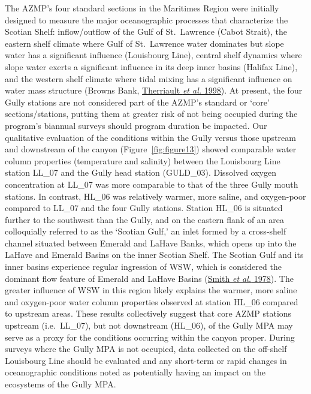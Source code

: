 \documentclass[12pt]{article}\usepackage[]{graphicx}\usepackage[]{color}
\begin{document}
The AZMP's four standard sections in the Maritimes Region were initially designed to measure the major oceanographic processes that characterize the Scotian Shelf: inflow/outflow of the Gulf of St.~Lawrence (Cabot Strait), the eastern shelf climate where Gulf of St.~Lawrence water dominates but slope water has a significant influence (Louisbourg Line), central shelf dynamics where slope water exerts a significant influence in its deep inner basins (Halifax Line), and the western shelf climate where tidal mixing has a significant influence on water mass structure (Browns Bank, \protect\hyperlink{ref-therriault_1998}{Therriault \textit{et al.} 1998}). At present, the four Gully stations are not considered part of the AZMP's standard or `core' sections/stations, putting them at greater risk of not being occupied during the program's biannual surveys should program duration be impacted. Our qualitative evaluation of the conditions within the Gully versus those upstream and downstream of the canyon (Figure~\ref{fig:figure13}) showed comparable water column properties (temperature and salinity) between the Louisbourg Line station LL\_07 and the Gully head station (GULD\_03). Dissolved oxygen concentration at LL\_07 was more comparable to that of the three Gully mouth stations. In contrast, HL\_06 was relatively warmer, more saline, and oxygen-poor compared to LL\_07 and the four Gully stations. Station HL\_06 is situated further to the southwest than the Gully, and on the eastern flank of an area colloquially referred to as the `Scotian Gulf,' an inlet formed by a cross-shelf channel situated between Emerald and LaHave Banks, which opens up into the LaHave and Emerald Basins on the inner Scotian Shelf. The Scotian Gulf and its inner basins experience regular ingression of WSW, which is considered the dominant flow feature of Emerald and LaHave Basins (\protect\hyperlink{ref-smith_1978}{Smith \textit{et al.} 1978}). The greater influence of WSW in this region likely explains the warmer, more saline and oxygen-poor water column properties observed at station HL\_06 compared to upstream areas. These results collectively suggest that core AZMP stations upstream (i.e.~LL\_07), but not downstream (HL\_06), of the Gully MPA may serve as a proxy for the conditions occurring within the canyon proper. During surveys where the Gully MPA is not occupied, data collected on the off-shelf Louisbourg Line should be evaluated and any short-term or rapid changes in oceanographic conditions noted as potentially having an impact on the ecosystems of the Gully MPA.
\end{document}
